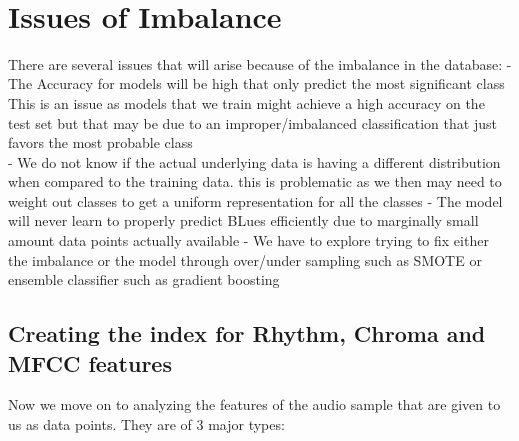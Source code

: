 \documentclass[11pt]{article}
\begin{document}
    \begin{center}
    \end{center}
    { \hspace*{\fill} \\}
    
    \hypertarget{issues-of-imbalance}{%
\section{Issues of Imbalance}\label{issues-of-imbalance}}

There are several issues that will arise because of the imbalance in the
database: - The Accuracy for models will be high that only predict the
most significant class This is an issue as models that we train might
achieve a high accuracy on the test set but that may be due to an
improper/imbalanced classification that just favors the most probable
class\\
- We do not know if the actual underlying data is having a different
distribution when compared to the training data. this is problematic as
we then may need to weight out classes to get a uniform representation
for all the classes - The model will never learn to properly predict
BLues efficiently due to marginally small amount data points actually
available - We have to explore trying to fix either the imbalance or the
model through over/under sampling such as SMOTE or ensemble classifier
such as gradient boosting

    \hypertarget{creating-the-index-for-rhythm-chroma-and-mfcc-features}{%
\subsection{Creating the index for Rhythm, Chroma and MFCC
features}\label{creating-the-index-for-rhythm-chroma-and-mfcc-features}}

Now we move on to analyzing the features of the audio sample that are
given to us as data points. They are of 3 major types:
\end{document}
